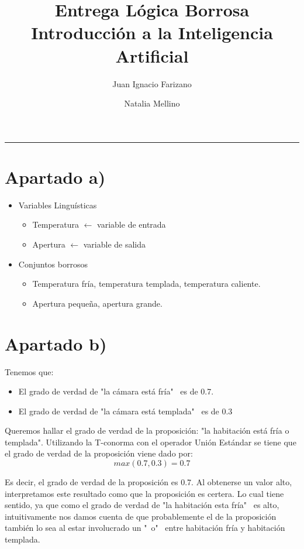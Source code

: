 \documentclass[11pt]{article}
\title{
    Entrega Lógica Borrosa \\
    \large Introducción a la Inteligencia Artificial}
\author{Juan Ignacio Farizano \and Natalia Mellino}
\date{}
\begin{document}
\maketitle
\noindent\rule{\textwidth}{1pt}

\section*{Apartado a)}

\begin{itemize}
\item Variables Linguísticas
  \begin{itemize}
    \item Temperatura $\leftarrow$ variable de entrada
    \item Apertura $\leftarrow$ variable de salida
  \end{itemize}
\item Conjuntos borrosos
  \begin{itemize}
    \item Temperatura fría, temperatura templada, temperatura caliente.
    \item Apertura pequeña, apertura grande.
  \end{itemize}
\end{itemize}

\section*{Apartado b)}

Tenemos que:

\begin{itemize}
    \item El grado de verdad de "la cámara está fría" \ es de 0.7.
    \item El grado de verdad de "la cámara está templada" \ es de 0.3
\end{itemize}

Queremos hallar el grado de verdad de la proposición: "la habitación está fría
o templada". Utilizando la T-conorma con el operador Unión Estándar se tiene que 
el grado de verdad de la proposición viene dado por:
\begin{equation*}
    max(0.7, 0.3) = 0.7
\end{equation*}

Es decir, el grado de verdad de la proposición es 0.7. Al obtenerse un valor
alto, interpretamos este resultado como que la proposición es certera. Lo cual
tiene sentido, ya que como el grado de verdad de "la habitación esta fría" \ es
alto, intuitivamente nos damos cuenta de que probablemente el de la proposición
también lo sea al estar involucrado un "\ o" \ entre habitación fría y habitación
templada. 
\end{document}
